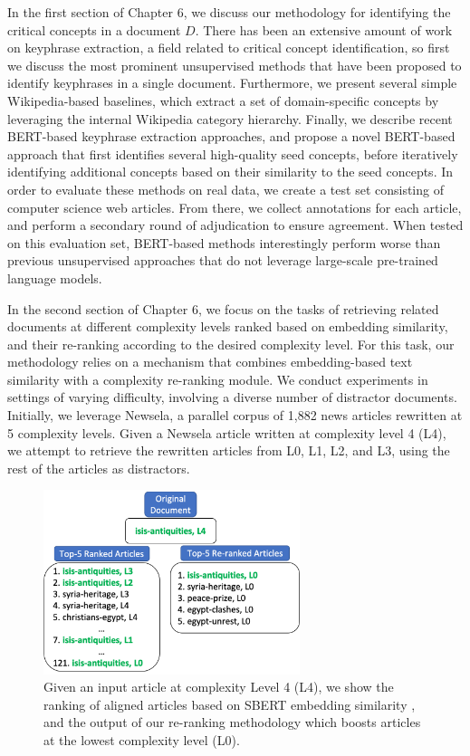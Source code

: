 \documentclass[thesis.tex]{subfiles}
\begin{document}
In the first section of Chapter 6, we discuss our methodology for identifying the critical concepts in a document $D$. There has been an extensive amount of work on keyphrase extraction, a field related to critical concept identification, so first we discuss the most prominent unsupervised methods that have been proposed to identify keyphrases in a single document. Furthermore, we present several simple Wikipedia-based baselines, which extract a set of domain-specific concepts by leveraging the internal Wikipedia category hierarchy. Finally, we describe recent BERT-based keyphrase extraction approaches, and propose a novel BERT-based approach that first identifies several high-quality seed concepts, before iteratively identifying additional concepts based on their similarity to the seed concepts. In order to evaluate these methods on real data, we create a test set consisting of computer science web articles. From there, we collect annotations for each article, and perform a secondary round of adjudication to ensure agreement. When tested on this evaluation set, BERT-based methods interestingly perform worse than previous unsupervised approaches that do not leverage large-scale pre-trained language models.

In the second section of Chapter 6, we focus on the tasks of retrieving related documents at different complexity levels ranked based on embedding similarity, and their re-ranking according to the desired complexity level. For this task, our methodology relies on a mechanism that combines embedding-based text similarity \citep{reimers2019sentence} with a complexity re-ranking module. We conduct experiments in settings of varying difficulty, involving a diverse number of distractor documents. Initially, we leverage Newsela, a parallel corpus of 1,882 news articles rewritten at 5 complexity levels. Given a Newsela article written at complexity level 4 (L4), we attempt to retrieve the rewritten articles from L0, L1, L2, and L3, using the rest of the articles as distractors. 

\begin{figure}[H]
    \centering
\includegraphics[width=7.5cm]{pictures/retrieval-example.png}
\caption{Given an input article at complexity Level 4 (L4), we show the ranking of aligned articles based on SBERT embedding similarity \cite{reimers2019sentence}, and the output of our re-ranking methodology which boosts articles at the lowest complexity level (L0).}
\label{fig:retrieval-example}
\end{figure}
\end{document}
